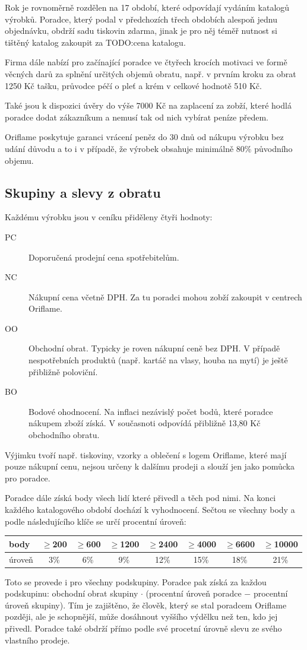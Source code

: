 \documentclass[a4wide,12pt]{report}
\begin{document}
Rok je rovnoměrně rozdělen na 17 období, které odpovídají vydáním katalogů výrobků. Poradce, který podal v předchozích třech obdobích alespoň jednu objednávku, obdrží sadu tiskovin zdarma, jinak je pro něj téměř nutnost si tištěný katalog zakoupit za TODO:cena katalogu.

Firma dále nabízí pro začínající poradce ve čtyřech krocích motivaci ve formě věcných darů za splnění určitých objemů obratu, např. v prvním kroku za obrat 1250 Kč tašku, průvodce péčí o pleť a krém v celkové hodnotě 510 Kč.

Také jsou k dispozici úvěry do výše 7000 Kč na zaplacení za zobží, které hodlá poradce dodat zákazníkum a nemusí tak od nich vybírat peníze předem.

Oriflame poskytuje garanci vrácení peněz do 30 dnů od nákupu výrobku bez udání důvodu a to i v případě, že výrobek obsahuje minimálně 80\% původního objemu.
\subsection{Skupiny a slevy z obratu}
Každému výrobku jsou v ceníku přiděleny čtyři hodnoty:
\begin{description}
\item[PC] Doporučená prodejní cena spotřebitelům.
\item[NC] Nákupní cena včetně DPH. Za tu poradci mohou zobží zakoupit v centrech Oriflame.
\item[OO] Obchodní obrat. Typicky je roven nákupní ceně bez DPH. V případě nespotřebních produktů (např. kartáč na vlasy, houba na mytí) je ještě přibližně poloviční.
\item[BO] Bodové ohodnocení. Na inflaci nezávislý počet bodů, které poradce nákupem zboží získá. V současnoti odpovídá přibližně 13,80 Kč obchodního obratu.
\end{description}
Výjimku tvoří např. tiskoviny, vzorky a oblečení s logem Oriflame, které mají pouze nákupní cenu,  nejsou určeny k dalšímu prodeji a slouží jen jako pomůcka pro poradce.

Poradce dále získá body všech lidí které přivedl a těch pod nimi. Na konci každého katalogového období dochází k vyhodnocení. Sečtou se všechny body a podle následujícího klíče se určí procentní úroveň:
\begin{center}
\begin{tabular}{|l|c|c|c|c|c|c|c|}
\hline
body & $\geq$200 & $\geq$600 & $\geq$1200 & $\geq$2400 & $\geq$4000 & $\geq$6600& $\geq$10000\\\hline
úroveň & 3\% & 6\% & 9\% & 12\% & 15\% & 18\% & 21\%\\\hline
\end{tabular}
\end{center}
Toto se provede i pro všechny podskupiny. Poradce pak získá za každou podskupinu: obchodní obrat skupiny $\cdot$ (procentní úroveň poradce $-$ procentní úroveň skupiny). Tím je zajištěno, že člověk, který se stal poradcem Oriflame později, ale je schopnější, může dosáhnout vyššího výdělku než ten, kdo jej přivedl. Poradce také obdrží přímo podle své procetní úrovně slevu ze svého vlastního prodeje.
\end{document}
